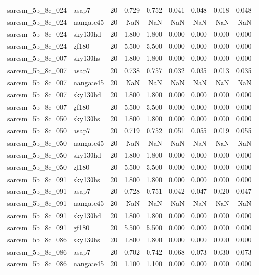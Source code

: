 \begin{tabular}{llrrrrrrr}
sarcsm\_5b\_8c\_024 & asap7 & 20 & 0.729 & 0.752 & 0.041 & 0.048 & 0.018 & 0.048 \\
sarcsm\_5b\_8c\_024 & nangate45 & 20 & NaN & NaN & NaN & NaN & NaN & NaN \\
sarcsm\_5b\_8c\_024 & sky130hd & 20 & 1.800 & 1.800 & 0.000 & 0.000 & 0.000 & 0.000 \\
sarcsm\_5b\_8c\_024 & gf180 & 20 & 5.500 & 5.500 & 0.000 & 0.000 & 0.000 & 0.000 \\
sarcsm\_5b\_8c\_007 & sky130hs & 20 & 1.800 & 1.800 & 0.000 & 0.000 & 0.000 & 0.000 \\
sarcsm\_5b\_8c\_007 & asap7 & 20 & 0.738 & 0.757 & 0.032 & 0.035 & 0.013 & 0.035 \\
sarcsm\_5b\_8c\_007 & nangate45 & 20 & NaN & NaN & NaN & NaN & NaN & NaN \\
sarcsm\_5b\_8c\_007 & sky130hd & 20 & 1.800 & 1.800 & 0.000 & 0.000 & 0.000 & 0.000 \\
sarcsm\_5b\_8c\_007 & gf180 & 20 & 5.500 & 5.500 & 0.000 & 0.000 & 0.000 & 0.000 \\
sarcsm\_5b\_8c\_050 & sky130hs & 20 & 1.800 & 1.800 & 0.000 & 0.000 & 0.000 & 0.000 \\
sarcsm\_5b\_8c\_050 & asap7 & 20 & 0.719 & 0.752 & 0.051 & 0.055 & 0.019 & 0.055 \\
sarcsm\_5b\_8c\_050 & nangate45 & 20 & NaN & NaN & NaN & NaN & NaN & NaN \\
sarcsm\_5b\_8c\_050 & sky130hd & 20 & 1.800 & 1.800 & 0.000 & 0.000 & 0.000 & 0.000 \\
sarcsm\_5b\_8c\_050 & gf180 & 20 & 5.500 & 5.500 & 0.000 & 0.000 & 0.000 & 0.000 \\
sarcsm\_5b\_8c\_091 & sky130hs & 20 & 1.800 & 1.800 & 0.000 & 0.000 & 0.000 & 0.000 \\
sarcsm\_5b\_8c\_091 & asap7 & 20 & 0.728 & 0.751 & 0.042 & 0.047 & 0.020 & 0.047 \\
sarcsm\_5b\_8c\_091 & nangate45 & 20 & NaN & NaN & NaN & NaN & NaN & NaN \\
sarcsm\_5b\_8c\_091 & sky130hd & 20 & 1.800 & 1.800 & 0.000 & 0.000 & 0.000 & 0.000 \\
sarcsm\_5b\_8c\_091 & gf180 & 20 & 5.500 & 5.500 & 0.000 & 0.000 & 0.000 & 0.000 \\
sarcsm\_5b\_8c\_086 & sky130hs & 20 & 1.800 & 1.800 & 0.000 & 0.000 & 0.000 & 0.000 \\
sarcsm\_5b\_8c\_086 & asap7 & 20 & 0.702 & 0.742 & 0.068 & 0.073 & 0.030 & 0.073 \\
sarcsm\_5b\_8c\_086 & nangate45 & 20 & 1.100 & 1.100 & 0.000 & 0.000 & 0.000 & 0.000 \\

\end{tabular}
